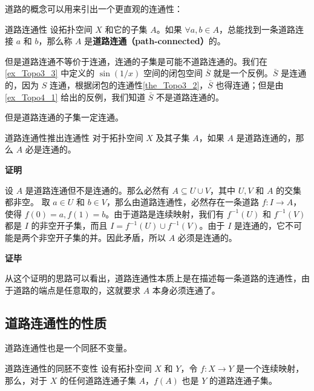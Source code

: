 道路的概念可以用来引出一个更直观的连通性：

\begin{definition}{道路连通性}\label{def_Topo4_2}
设拓扑空间 $X$ 和它的子集 $A$。如果 $\forall a, b\in A$，总能找到一条道路连接 $a$ 和 $b$，那么称 $A$ 是\textbf{道路连通（path-connected）}的。
\end{definition}

但是道路连通不等价于连通，连通的子集是可能不道路连通的。我们在\autoref{ex_Topo3_3} 中定义的 $\sin(1/x)$ 空间的闭包空间 $\bar{S}$ 就是一个反例。$\bar{S}$ 是连通的，因为 $S$ 连通，根据闭包的连通性\autoref{the_Topo3_2}，$\bar{S}$ 也得连通；但是由\autoref{ex_Topo4_1} 给出的反例，我们知道 $\bar{S}$ 不是道路连通的。

但是道路连通的子集一定连通。

\begin{theorem}{道路连通性推出连通性}\label{the_Topo4_1}
对于拓扑空间 $X$ 及其子集 $A$，如果 $A$ 是道路连通的，那么 $A$ 必是连通的。
\end{theorem}

\textbf{证明}

设 $A$ 是道路连通但不是连通的。那么必然有 $A\subseteq U\cup V$，其中 $U, V$ 和 $A$ 的交集都非空。
取 $a\in U$ 和 $b\in V$，那么由道路连通性，必然存在一条道路 $f:I\rightarrow A$，使得 $f(0)=a, f(1)=b$。由于道路是连续映射，我们有 $f^{-1}(U)$ 和 $f^{-1}(V)$ 都是 $I$ 的非空开子集，而且 $I=f^{-1}(U)\cup f^{-1}(V)$。由于 $I$ 是连通的，它不可能是两个非空开子集的并。因此矛盾，所以 $A$ 必须是连通的。

\textbf{证毕}

从这个证明的思路可以看出，道路连通性本质上是在描述每一条道路的连通性，由于道路的端点是任意取的，这就要求 $A$ 本身必须连通了。

\subsection{道路连通性的性质}

道路连通性也是一个同胚不变量。

\begin{theorem}{道路连通性的同胚不变性}
设有拓扑空间 $X$ 和 $Y$，令 $f:X\rightarrow Y$ 是一个连续映射，那么，对于 $X$ 的任何道路连通子集 $A$，$f(A)$ 也是 $Y$ 的道路连通子集。
\end{theorem}
